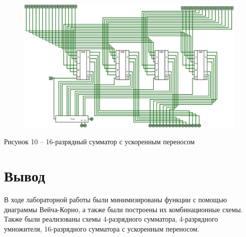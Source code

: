 \documentclass[a4paper,14pt]{extarticle}
\begin{document}
	\begin{figure}[h]
		\centering
		\includegraphics[width=1\linewidth]{images/s-4-4}
	\end{figure}
	\begin{center}
		Рисунок 10 – 16-разрядный сумматор с ускоренным переносом
	\end{center}
	
	\newpage
	\section*{Вывод}
	В ходе лабораторной работы были минимизированы функции с помощью диаграммы Вейча-Корно, а также были построены их комбинационные схемы. Также были реализованы схемы 4-разрядного сумматора, 4-разрядного умножителя, 16-разрядного сумматора с ускоренным переносом.
	
\end{document}
